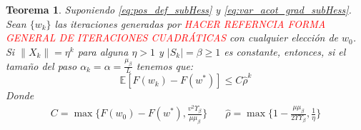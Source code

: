 \documentclass{book}
\theoremstyle{plain}
\newtheorem{thm}{Teorema}[section]
\theoremstyle{definition}
\theoremstyle{remark}
\begin{document}
\begin{thm}\label{r-linear}
Suponiendo \ref{eq:pos_def_subHess} y \ref{eq:var_acot_grad_subHess}. Sean $\{w_k\}$ las iteraciones generadas por \textcolor{red}{HACER REFERNCIA FORMA GENERAL DE ITERACIONES CUADRÁTICAS} con cualquier elección de $w_0$. Si $\|X_k\|  = \eta^k$ para alguna $\eta > 1$ y $|S_k| = \beta\geq 1$ es constante, entonces, si el tamaño del paso $\alpha_k = \alpha = \frac{\mu_\beta}{L}$ tenemos que:
\begin{equation}\label{eq:r-linear}
    \mathbb{E}[F(w_k) - F(w^*)] \leq C\hat{\rho}^k
\end{equation}
Donde
\begin{equation}
   \begin{split}
       C = \max\bigg\{F(w_0) - F(w^*), \frac{v^2\Upsilon_\beta}{\mu\mu_\beta}\bigg\} & \quad \hat{\rho} = \max\bigg\{1- \frac{\mu\mu_\beta}{2\Upsilon\Upsilon_\beta}, \frac{1}{\eta}\bigg\}
   \end{split}
\end{equation}
\end{thm}
\end{document}
